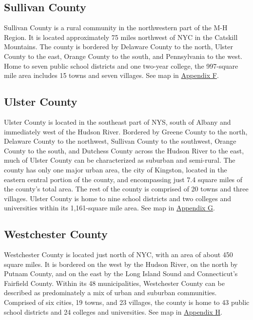 \documentclass[
  english,
  letterpaper,
]{report}
\begin{document}
\subsection{Sullivan County}\label{sullivan-county-1}

Sullivan County is a rural community in the northwestern part of the M-H
Region. It is located approximately 75 miles northwest of NYC in the
Catskill Mountains. The county is bordered by Delaware County to the
north, Ulster County to the east, Orange County to the south, and
Pennsylvania to the west. Home to seven public school districts and one
two-year college, the 997-square mile area includes 15 towns and seven
villages. See map in \hyperref[sec-appendix-f-map]{Appendix F}.

\subsection{Ulster County}\label{ulster-county}

Ulster County is located in the southeast part of NYS, south of Albany
and immediately west of the Hudson River. Bordered by Greene County to
the north, Delaware County to the northwest, Sullivan County to the
southwest, Orange County to the south, and Dutchess County across the
Hudson River to the east, much of Ulster County can be characterized as
suburban and semi-rural. The county has only one major urban area, the
city of Kingston, located in the eastern central portion of the county,
and encompassing just 7.4 square miles of the county's total area. The
rest of the county is comprised of 20 towns and three villages. Ulster
County is home to nine school districts and two colleges and
universities within its 1,161-square mile area. See map in
\hyperref[sec-appendix-g-map]{Appendix G}.

\subsection{Westchester County}\label{westchester-county-1}

Westchester County is located just north of NYC, with an area of about
450 square miles. It is bordered on the west by the Hudson River, on the
north by Putnam County, and on the east by the Long Island Sound and
Connecticut's Fairfield County. Within its 48 municipalities,
Westchester County can be described as predominately a mix of urban and
suburban communities. Comprised of six cities, 19 towns, and 23
villages, the county is home to 43 public school districts and 24
colleges and universities. See map in
\hyperref[sec-appendix-h-map]{Appendix H}.
\end{document}
